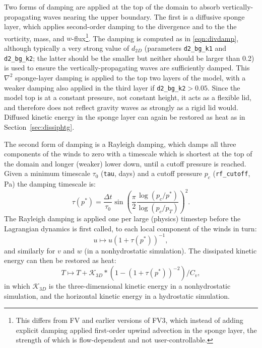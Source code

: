 \documentclass[10pt,letterpaper,margin=1in]{memoir}
\begin{document}
Two forms of damping are applied at the top of the domain to absorb vertically-propagating waves nearing the upper boundary. The first is a diffusive sponge layer, which applies second-order damping to the divergence and to the the vorticity, mass, and $w$-flux\footnote{This differs from FV and earlier versions of FV3, which instead of adding explicit damping applied first-order upwind advection in the sponge layer, the strength of which is flow-dependent and not user-controllable.}.  The damping is computed as in \eqref{eqn:divdamp}, although typically a very strong value of $d_{2D}$ (parameters \texttt{d2_bg_k1} and \texttt{d2_bg_k2}; the latter should be the smaller but neither should be larger than 0.2) is used to ensure the vertically-propagating waves are sufficiently damped. This $\nabla^2$ sponge-layer damping is applied to the top two layers of the model, with a weaker damping also applied in the third layer if \texttt{d2_bg_k2}$> 0.05$. Since the model top is at a constant pressure, not constant height, it acts as a flexible lid, and therefore does not reflect gravity waves as strongly as a rigid lid would. Diffused kinetic energy in the sponge layer can again be restored as heat as in Section~\ref{sec:dissiphtg}.

The second form of damping is a Rayleigh damping, which damps all three components of the winds to zero with a timescale which is shortest at the top of the domain and longer (weaker) lower down, until a cutoff pressure is reached. Given a minimum timescale $\tau_0$ (\texttt{tau}, days) and a cutoff pressure $p_c$ (\texttt{rf_cutoff}, Pa) the damping timescale is:
\begin{equation}
\tau \left(p^*\right) = \frac{\Delta t}{ \tau_0} \sin \left ( \frac{\pi}{2} \frac{\log(p_c/p^*) }{\log(p_c/p_T)} \right )^2 .
\end{equation}
The Rayleigh damping is applied one per large (physics) timestep before the Lagrangian dynamics is first called, to each local component of the winds in turn:
\begin{equation}
 u \mapsto u \left ( 1 + \tau \left(p^*\right)  \right )^{-1},
\end{equation}
and similarly for $v$ and $w$ (in a nonhydrostatic simulation). The dissipated kinetic energy can then be restored as heat:
\begin{equation}
T \mapsto T + \mathcal{K}_{3D}* \left ( 1 -  \left ( 1 + \tau \left(p^*\right)  \right )^{-2} \right )  / C_v,
\end{equation}
in which $\mathcal{K}_{3D}$ is the three-dimensional kinetic energy in a nonhydrostatic simulation, and the horizontal kinetic energy in a hydrostatic simulation.
\end{document}
